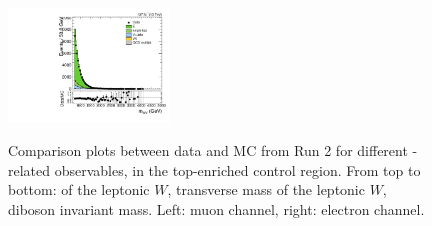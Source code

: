 \begin{figure}[htbp]
  \includegraphics[width=0.3825\textwidth]{fig/analysisAppendix/CR_b1_e_allP_allC_allD_Run2_mWV.pdf}\\
  \caption{
    Comparison plots between data and MC from Run 2 for different \Wlep-related observables, in the top-enriched control region.
    From top to bottom: \pt of the leptonic $W$, transverse mass of the leptonic $W$, diboson invariant mass.
    Left: muon channel, right: electron channel.
  }
  \label{fig:CR_controlPlotsRun2_2}
\end{figure}

